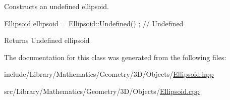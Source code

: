 Constructs an undefined ellipsoid. 


\begin{DoxyCode}
\hyperlink{classlibrary_1_1math_1_1geom_1_1d3_1_1objects_1_1_ellipsoid_aae81fe0edc7f0e8d4590ea89ae73cb14}{Ellipsoid} ellipsoid = \hyperlink{classlibrary_1_1math_1_1geom_1_1d3_1_1objects_1_1_ellipsoid_affcef36f736e6d21a0246a149b8fb688}{Ellipsoid::Undefined}() ; \textcolor{comment}{// Undefined}
\end{DoxyCode}


\begin{DoxyReturn}{Returns}
Undefined ellipsoid 
\end{DoxyReturn}


The documentation for this class was generated from the following files\+:\begin{DoxyCompactItemize}
\item 
include/\+Library/\+Mathematics/\+Geometry/3\+D/\+Objects/\hyperlink{_ellipsoid_8hpp}{Ellipsoid.\+hpp}\item 
src/\+Library/\+Mathematics/\+Geometry/3\+D/\+Objects/\hyperlink{_ellipsoid_8cpp}{Ellipsoid.\+cpp}\end{DoxyCompactItemize}
